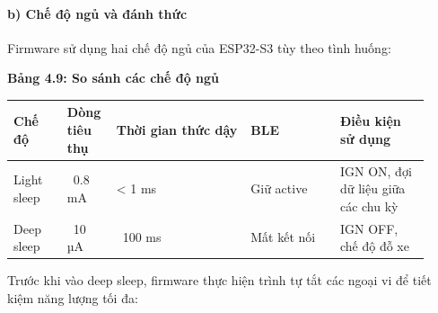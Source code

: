 \documentclass[13pt,a4paper]{extarticle}
\newcounter{none} %
\newcommand{\thesislongtableorignewline}{}
\let\thesislongtableorignewline\\
\renewcommand{\\}{\thesislongtableorignewline\hline}%
\let\\\thesislongtableorignewline
\newcommand{\thesistabletitle}[1]{%
  \begin{center}\textbf{#1}\end{center}%
}
\begin{document}
\paragraph{b) Chế độ ngủ và đánh
thức}\label{b-chux1ebf-ux111ux1ed9-ngux1ee7-vuxe0-ux111uxe1nh-thux1ee9c}

Firmware sử dụng hai chế độ ngủ của ESP32-S3 tùy theo tình huống:

\thesistabletitle{Bảng 4.9: So sánh các chế độ ngủ}

{\def\LTcaptype{none} %
\begin{longtable}{|p{0.12\linewidth}|p{0.10\linewidth}|p{0.30\linewidth}|p{0.20\linewidth}|p{0.20\linewidth}|}
\hline \textbf{Chế độ} & \textbf{Dòng tiêu thụ} & \textbf{Thời gian thức dậy} & \textbf{BLE} & \textbf{Điều kiện sử dụng} \\
\hline
\endhead
\hline
\endlastfoot
Light sleep & ~0.8 mA & \textless{} 1 ms & Giữ active &
IGN ON, đợi dữ liệu giữa các chu kỳ \\
Deep sleep & ~10 µA & ~100 ms & Mất kết nối
& IGN OFF, chế độ đỗ xe \\
\end{longtable}
}

Trước khi vào deep sleep, firmware thực hiện trình tự tắt các ngoại vi
để tiết kiệm năng lượng tối đa:
\end{document}
